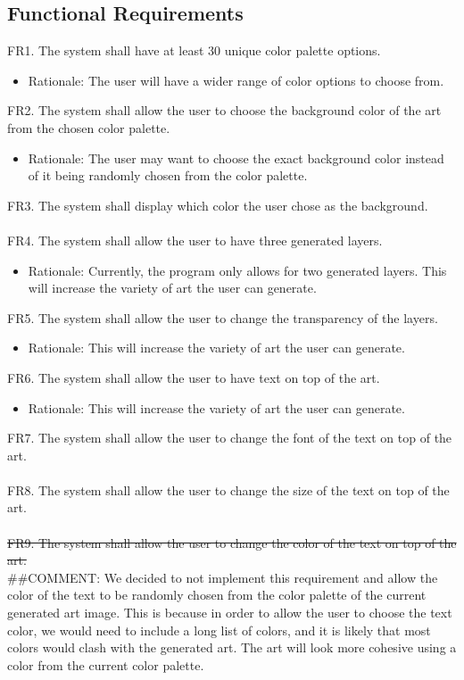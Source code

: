 \documentclass[12pt, titlepage]{article}
\begin{document}
\subsection{Functional Requirements}
FR1. The system shall have at least 30 unique color palette options.
\begin{itemize}
    \item Rationale: The user will have a wider range of color options to choose from.
\end{itemize}
FR2. The system shall allow the user to choose the background color of the art from the chosen color palette.
\begin{itemize}
    \item Rationale: The user may want to choose the exact background color instead of it being randomly chosen from the color palette.
\end{itemize}
FR3. The system shall display which color the user chose as the background.\\
\\
FR4. The system shall allow the user to have three generated layers.
\begin{itemize}
    \item Rationale: Currently, the program only allows for two generated layers. This will increase the variety of art the user can generate.
\end{itemize}
FR5. The system shall allow the user to change the transparency of the layers.
\begin{itemize}
    \item Rationale: This will increase the variety of art the user can generate.
\end{itemize}
FR6. The system shall allow the user to have text on top of the art.
\begin{itemize}
    \item Rationale: This will increase the variety of art the user can generate.
\end{itemize}
FR7. The system shall allow the user to change the font of the text on top of the art.\\
\\
FR8. The system shall allow the user to change the size of the text on top of the art.\\
\\
\st{FR9. The system shall allow the user to change the color of the text on top of the art.}\\
\color{red} \#\#COMMENT: We decided to not implement this requirement and allow the color of the text to be randomly chosen from the color palette of the current generated art image. This is because in order to allow the user to choose the text color, we would need to include a long list of colors, and it is likely that most colors would clash with the generated art. The art will look more cohesive using a color from the current color palette. \color{black}\\
\end{document}
